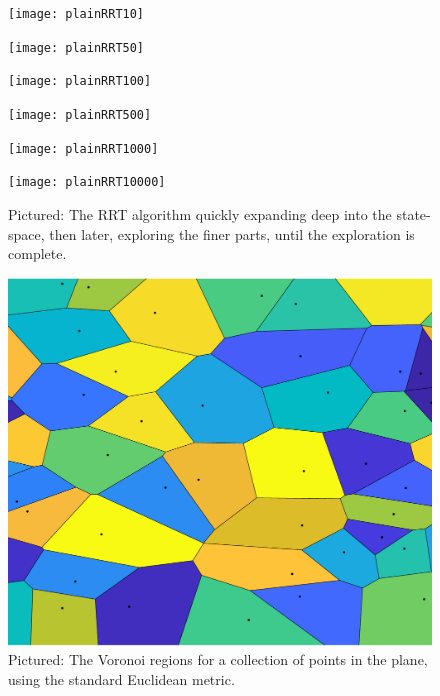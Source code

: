 \begin{figure}
  \centering 
\end{figure}

\begin{figure}
  \begin{minipage}[c]{0.3\textwidth}
    \texttt{[image: plainRRT10]}
  \end{minipage}
  \begin{minipage}[c]{0.3\textwidth}
    \texttt{[image: plainRRT50]}
  \end{minipage}
  \begin{minipage}[c]{0.3\textwidth}
    \texttt{[image: plainRRT100]}
  \end{minipage}
  \newline %
  \begin{minipage}[c]{0.3\textwidth}
    \texttt{[image: plainRRT500]}
  \end{minipage}
  \begin{minipage}[c]{0.3\textwidth}
    \texttt{[image: plainRRT1000]}
  \end{minipage}
  \begin{minipage}[c]{0.3\textwidth}
    \texttt{[image: plainRRT10000]}
  \end{minipage}
  \caption{Pictured: The \ac{RRT} algorithm quickly expanding deep into the
    state-space, then later, exploring the finer parts, until the exploration is
    complete.}
  \label{fig:rrt-expansion}
\end{figure}


\begin{figure}
  \centering \includegraphics[scale=.3]{figures/rrt/voronoi-diagram}
  \caption{Pictured: The Voronoi regions for a collection of points in the
    plane, using the standard Euclidean metric.}
  \label{fig:voronoi-diagram}
\end{figure}

